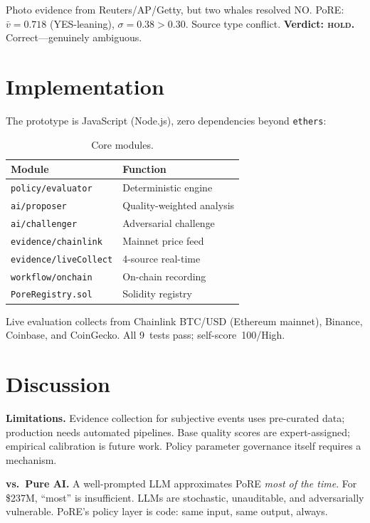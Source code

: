 \documentclass[11pt,a4paper,twocolumn]{article}
\begin{document}
Photo evidence from Reuters/AP/Getty, but two whales resolved NO. PoRE: $\bar{v}=0.718$ (YES-leaning), $\sigma=0.38>0.30$. Source type conflict. \textbf{Verdict: \textsc{hold}.} Correct---genuinely ambiguous.

\section{Implementation}

The prototype is JavaScript (Node.js), zero dependencies beyond \texttt{ethers}:

\begin{table}[h]
\centering
\caption{Core modules.}
\label{tab:modules}
\footnotesize
\begin{tabularx}{\columnwidth}{@{}lX@{}}
\toprule
\textbf{Module} & \textbf{Function} \\
\midrule
\texttt{policy/evaluator} & Deterministic engine \\
\texttt{ai/proposer} & Quality-weighted analysis \\
\texttt{ai/challenger} & Adversarial challenge \\
\texttt{evidence/chainlink} & Mainnet price feed \\
\texttt{evidence/liveCollect} & 4-source real-time \\
\texttt{workflow/onchain} & On-chain recording \\
\texttt{PoreRegistry.sol} & Solidity registry \\
\bottomrule
\end{tabularx}
\end{table}

Live evaluation collects from Chainlink BTC/USD (Ethereum mainnet), Binance, Coinbase, and CoinGecko. All 9~tests pass; self-score~100/High.

\section{Discussion}

\textbf{Limitations.} Evidence collection for subjective events uses pre-curated data; production needs automated pipelines. Base quality scores are expert-assigned; empirical calibration is future work. Policy parameter governance itself requires a mechanism.

\textbf{vs.\ Pure AI.} A well-prompted LLM approximates PoRE \emph{most of the time}. For \$237M, ``most'' is insufficient. LLMs are stochastic, unauditable, and adversarially vulnerable. PoRE's policy layer is code: same input, same output, always.
\end{document}
